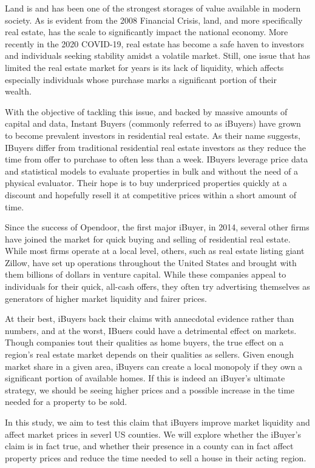 Land is and has been one of the strongest storages of value available in modern society. As is evident from the 2008 Financial Crisis, land, and more specifically real estate, has the scale to significantly impact the national economy. More recently in the 2020 COVID-19, real estate has become a safe haven to investors and individuals seeking stability amidst a volatile market. Still, one issue that has limited the real estate market for years is its lack of liquidity, which affects especially individuals whose purchase marks a significant portion of their wealth.  

With the objective of tackling this issue, and backed by massive amounts of capital and data, Instant Buyers (commonly referred to as iBuyers) have grown to become prevalent investors in residential real estate. As their name suggests, IBuyers differ from traditional residential real estate investors as they reduce the time from offer to purchase to often less than a week. IBuyers leverage price data and statistical models to evaluate properties in bulk and without the need of a physical evaluator. Their hope is to buy underpriced properties quickly at a discount and hopefully resell it at competitive prices within a short amount of time. 

Since the success of Opendoor, the first major iBuyer, in 2014, several other firms have joined the market for quick buying and selling of residential real estate. While most firms operate at a local level, others, such as real estate listing giant Zillow, have set up operations throughout the United States and brought with them billions of dollars in venture capital. While these companies appeal to individuals for their quick, all-cash offers, they often try advertising themselves as generators of higher market liquidity and fairer prices.  

At their best, iBuyers back their claims with annecdotal evidence rather than numbers, and at the worst, IBuers could have a detrimental effect on markets. Though companies tout their qualities as home buyers, the true effect on a region's real estate market depends on their qualities as sellers. Given enough market share in a given area, iBuyers can create a local monopoly if they own a significant portion of available homes. If this is indeed an iBuyer's ultimate strategy, we should be seeing higher prices and a possible increase in the time needed for a property to be sold.

In this study, we aim to test this claim that iBuyers improve market liquidity and affect market prices in severl US counties. We will explore whether the iBuyer's claim is in fact true, and whether their presence in a county can in fact affect property prices and reduce the time needed to sell a house in their acting region.
